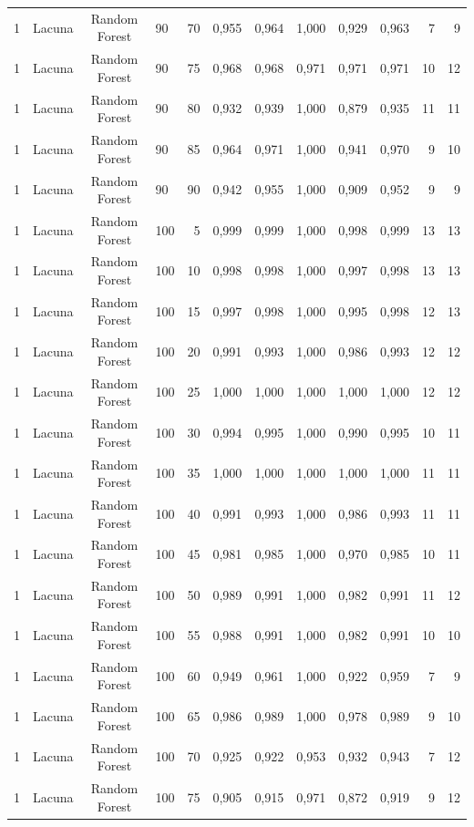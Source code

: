 \begin{longtable}{ccclrrrrrrrr}
1 & Lacuna & Random Forest & 90 & 70 & 0,955 & 0,964 & 1,000 & 0,929 & 0,963 & 7 & 9 \\
1 & Lacuna & Random Forest & 90 & 75 & 0,968 & 0,968 & 0,971 & 0,971 & 0,971 & 10 & 12 \\
1 & Lacuna & Random Forest & 90 & 80 & 0,932 & 0,939 & 1,000 & 0,879 & 0,935 & 11 & 11 \\
1 & Lacuna & Random Forest & 90 & 85 & 0,964 & 0,971 & 1,000 & 0,941 & 0,970 & 9 & 10 \\
1 & Lacuna & Random Forest & 90 & 90 & 0,942 & 0,955 & 1,000 & 0,909 & 0,952 & 9 & 9 \\
1 & Lacuna & Random Forest & 100 & 5 & 0,999 & 0,999 & 1,000 & 0,998 & 0,999 & 13 & 13 \\
1 & Lacuna & Random Forest & 100 & 10 & 0,998 & 0,998 & 1,000 & 0,997 & 0,998 & 13 & 13 \\
1 & Lacuna & Random Forest & 100 & 15 & 0,997 & 0,998 & 1,000 & 0,995 & 0,998 & 12 & 13 \\
1 & Lacuna & Random Forest & 100 & 20 & 0,991 & 0,993 & 1,000 & 0,986 & 0,993 & 12 & 12 \\
1 & Lacuna & Random Forest & 100 & 25 & 1,000 & 1,000 & 1,000 & 1,000 & 1,000 & 12 & 12 \\
1 & Lacuna & Random Forest & 100 & 30 & 0,994 & 0,995 & 1,000 & 0,990 & 0,995 & 10 & 11 \\
1 & Lacuna & Random Forest & 100 & 35 & 1,000 & 1,000 & 1,000 & 1,000 & 1,000 & 11 & 11 \\
1 & Lacuna & Random Forest & 100 & 40 & 0,991 & 0,993 & 1,000 & 0,986 & 0,993 & 11 & 11 \\
1 & Lacuna & Random Forest & 100 & 45 & 0,981 & 0,985 & 1,000 & 0,970 & 0,985 & 10 & 11 \\
1 & Lacuna & Random Forest & 100 & 50 & 0,989 & 0,991 & 1,000 & 0,982 & 0,991 & 11 & 12 \\
1 & Lacuna & Random Forest & 100 & 55 & 0,988 & 0,991 & 1,000 & 0,982 & 0,991 & 10 & 10 \\
1 & Lacuna & Random Forest & 100 & 60 & 0,949 & 0,961 & 1,000 & 0,922 & 0,959 & 7 & 9 \\
1 & Lacuna & Random Forest & 100 & 65 & 0,986 & 0,989 & 1,000 & 0,978 & 0,989 & 9 & 10 \\
1 & Lacuna & Random Forest & 100 & 70 & 0,925 & 0,922 & 0,953 & 0,932 & 0,943 & 7 & 12 \\
1 & Lacuna & Random Forest & 100 & 75 & 0,905 & 0,915 & 0,971 & 0,872 & 0,919 & 9 & 12 \\

\end{longtable}
